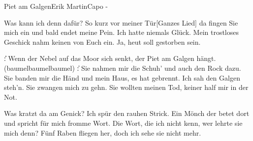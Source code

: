 \begin{song}{Piet am Galgen}{Erik Martin}{Capo -}

Was kann ich denn dafür? So kurz vor meiner Tür[Ganzes Lied]
da fingen Sie mich ein und bald endet meine Pein.
Ich hatte niemals Glück. Mein trostloses Geschick
nahm keinen von Euch ein. Ja, heut soll gestorben sein.

\|\|: Wenn der Nebel auf das Moor sich senkt,
der Piet am Galgen hängt. (baumelbaumelbaumel) :\|\|

Sie nahmen mir die Schuh' und auch den Rock dazu.
Sie banden mir die Händ und mein Haus, es hat gebrennt.
Ich sah den Galgen steh'n. Sie zwangen mich zu gehn.
Sie wollten meinen Tod, keiner half mir in der Not.


Was kratzt da am Genick? Ich spür den rauhen Strick.
Ein Mönch der betet dort und spricht für mich fromme Wort.
Die Wort, die ich nicht kenn, wer lehrte sie mich denn?
Fünf Raben fliegen her, doch ich sehe sie nicht mehr.

\end{song}
